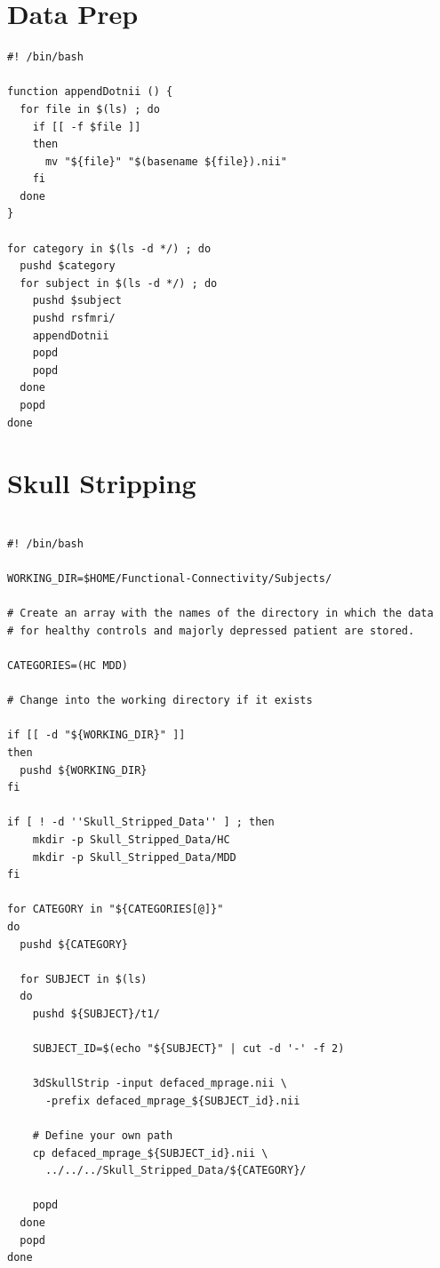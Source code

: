 \documentclass[12pt]{article}
\begin{document}
\section{Data Prep}

\begingroup
\fontsize{10pt}{8pt}\selectfont
\begin{verbatim}
#! /bin/bash

function appendDotnii () {
  for file in $(ls) ; do
    if [[ -f $file ]]
    then
      mv "${file}" "$(basename ${file}).nii"
    fi
  done
}

for category in $(ls -d */) ; do
  pushd $category
  for subject in $(ls -d */) ; do
    pushd $subject
    pushd rsfmri/
    appendDotnii
    popd
    popd
  done
  popd
done

\end{verbatim}

\section{Skull Stripping}

\begin{verbatim}

#! /bin/bash

WORKING_DIR=$HOME/Functional-Connectivity/Subjects/

# Create an array with the names of the directory in which the data
# for healthy controls and majorly depressed patient are stored.

CATEGORIES=(HC MDD)

# Change into the working directory if it exists

if [[ -d "${WORKING_DIR}" ]]
then
  pushd ${WORKING_DIR}
fi

if [ ! -d ''Skull_Stripped_Data'' ] ; then
    mkdir -p Skull_Stripped_Data/HC
    mkdir -p Skull_Stripped_Data/MDD
fi

for CATEGORY in "${CATEGORIES[@]}"
do
  pushd ${CATEGORY}

  for SUBJECT in $(ls)
  do
    pushd ${SUBJECT}/t1/

    SUBJECT_ID=$(echo "${SUBJECT}" | cut -d '-' -f 2)

    3dSkullStrip -input defaced_mprage.nii \
      -prefix defaced_mprage_${SUBJECT_id}.nii

    # Define your own path
    cp defaced_mprage_${SUBJECT_id}.nii \
      ../../../Skull_Stripped_Data/${CATEGORY}/

    popd
  done
  popd
done

\end{verbatim}
\end{document}
